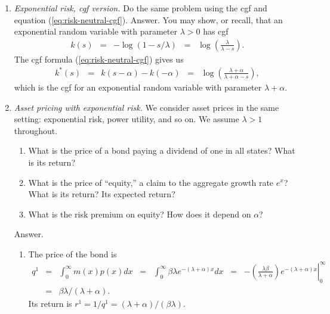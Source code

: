 \documentclass[11pt]{article}
\begin{document}
\begin{enumerate}
\item {\it Exponential risk, cgf version.\/}
Do the same problem using the cgf and equation (\ref{eq:risk-neutral-cgf}).
%
Answer.  You may show, or recall,
that an exponential random variable with parameter $\lambda>0$
has cgf
\begin{eqnarray*}
    k(s) &=& - \log (1-s/\lambda) \;\;=\;\; \log \left( \frac{\lambda}{\lambda - s}\right).
\end{eqnarray*}
The cgf formula (\ref{eq:risk-neutral-cgf}) gives us
\begin{eqnarray*}
    k^*(s) &=& k(s-\alpha) - k(-\alpha)
            \;\;=\;\; \log \left( \frac{\lambda+\alpha}{\lambda+\alpha - s}\right),
\end{eqnarray*}
which is the cgf for an exponential random variable with parameter $\lambda + \alpha$.

\item {\it Asset pricing with exponential risk.\/}
We consider asset prices in the same setting:
exponential risk, power utility, and so on.
We assume $\lambda > 1$ throughout.
\begin{enumerate}
\item What is the price of a bond paying a dividend of one in all states?
What is its return?
\item What is the price of ``equity,'' a claim to the aggregate growth rate $e^x$?
What is its return?  Its expected return?
\item What is the risk premium on equity?  How does it depend on $\alpha$?
\end{enumerate}
%
Answer.
\begin{enumerate}
\item The price of the bond is
\begin{eqnarray*}
    q^1 &=& \int_{0}^\infty  m(x) p(x) dx
            \;\;=\;\; \int_{0}^\infty \beta \lambda e^{-(\lambda + \alpha) x} dx
            \;\;=\;\; \left. - \left( \frac{\lambda \beta}{\lambda + \alpha} \right) e^{-(\lambda + \alpha) x} \right|_0^\infty  \\
        &=& \beta \lambda /(\lambda + \alpha) . \phantom{sum^K}
\end{eqnarray*}
Its return is $r^1 = 1/q^1 = (\lambda + \alpha)/(\beta \lambda )$.


\end{enumerate}
\end{enumerate}
\end{document}
